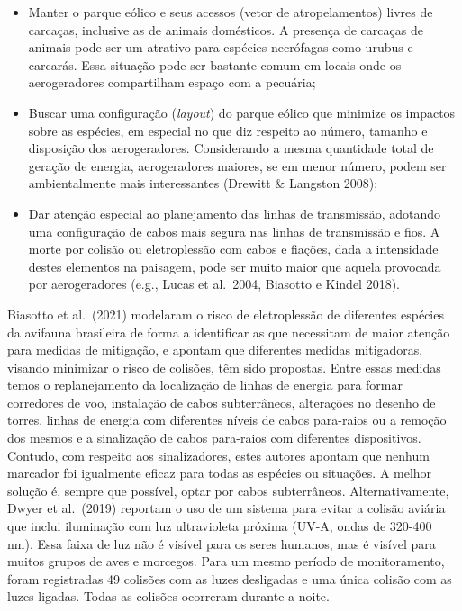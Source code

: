 \documentclass[
  oneside]{scrbook}
\begin{document}
\begin{itemize}
\item
  Manter o parque eólico e seus acessos (vetor de atropelamentos) livres de carcaças, inclusive as de animais domésticos. A presença de carcaças de animais pode ser um atrativo para espécies necrófagas como urubus e carcarás. Essa situação pode ser bastante comum em locais onde os aerogeradores compartilham espaço com a pecuária;
\item
  Buscar uma configuração (\emph{layout}) do parque eólico que minimize os impactos sobre as espécies, em especial no que diz respeito ao número, tamanho e disposição dos aerogeradores. Considerando a mesma quantidade total de geração de energia, aerogeradores maiores, se em menor número, podem ser ambientalmente mais interessantes (Drewitt \& Langston 2008);
\item
  Dar atenção especial ao planejamento das linhas de transmissão, adotando uma configuração de cabos mais segura nas linhas de transmissão e fios. A morte por colisão ou eletroplessão com cabos e fiações, dada a intensidade destes elementos na paisagem, pode ser muito maior que aquela provocada por aerogeradores (e.g., Lucas et al.~2004, Biasotto e Kindel 2018).
\end{itemize}

Biasotto et al.~(2021) modelaram o risco de eletroplessão de diferentes espécies da avifauna brasileira de forma a identificar as que necessitam de maior atenção para medidas de mitigação, e apontam que diferentes medidas mitigadoras, visando minimizar o risco de colisões, têm sido propostas. Entre essas medidas temos o replanejamento da localização de linhas de energia para formar corredores de voo, instalação de cabos subterrâneos, alterações no desenho de torres, linhas de energia com diferentes níveis de cabos para-raios ou a remoção dos mesmos e a sinalização de cabos para-raios com diferentes dispositivos. Contudo, com respeito aos sinalizadores, estes autores apontam que nenhum marcador foi igualmente eficaz para todas as espécies ou situações. A melhor solução é, sempre que possível, optar por cabos subterrâneos. Alternativamente, Dwyer et al.~(2019) reportam o uso de um sistema para evitar a colisão aviária que inclui iluminação com luz ultravioleta próxima (UV-A, ondas de 320-400 nm). Essa faixa de luz não é visível para os seres humanos, mas é visível para muitos grupos de aves e morcegos. Para um mesmo período de monitoramento, foram registradas 49 colisões com as luzes desligadas e uma única colisão com as luzes ligadas. Todas as colisões ocorreram durante a noite.
\end{document}
